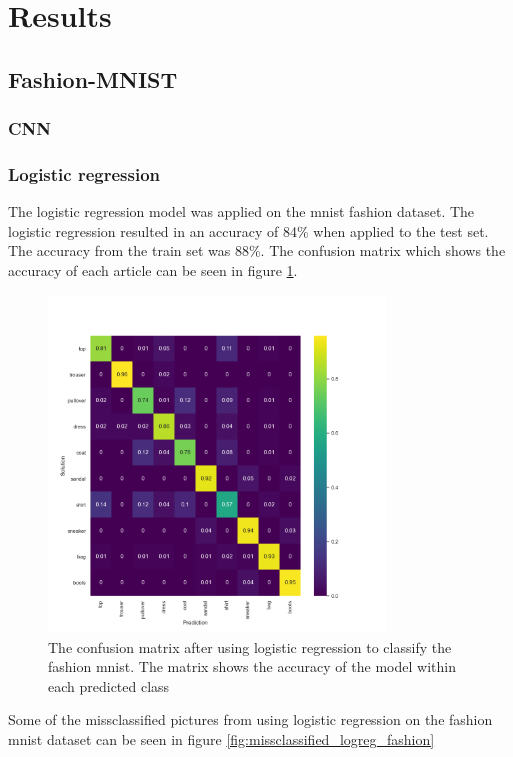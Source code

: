 \documentclass[../main.tex]{subfiles}
\begin{document}
\section{Results}

\subsection{Fashion-MNIST}
\subsubsection{CNN}
\subsubsection{Logistic regression}
The logistic regression model was applied on the mnist fashion dataset. The logistic regression resulted in an accuracy of 84\% when applied to the test set. The accuracy from the train set was 88\%. The confusion matrix which shows the accuracy of each article can be seen in figure \ref{fig:logreg_mnist_cm}.
\begin{figure}[H]
    \centering
    \includegraphics[width=0.8\textwidth]{doc/assets/logreg_fashion_heatmap_accuracy84.png}
    \caption{The confusion matrix after using logistic regression to classify the fashion mnist. The matrix shows the accuracy of the model within each predicted class}
    \label{fig:logreg_mnist_cm}
\end{figure}

Some of the missclassified pictures from using logistic regression on the fashion mnist dataset can be seen in figure \ref{fig:missclassified_logreg_fashion}
\end{document}
